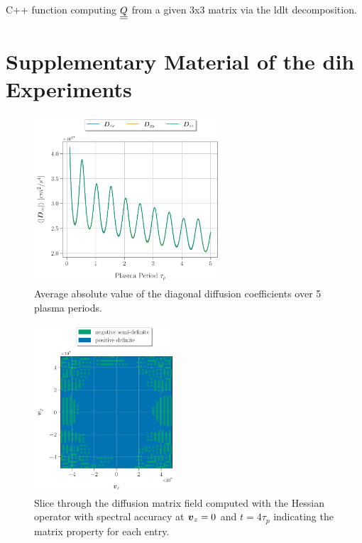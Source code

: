 \begin{listing}[!ht]
    \vspace{3.3mm}
    \inputminted[]{c++}{code_snippets/LDLT.cpp}
    \caption{C++ function computing $\matr Q$ from a given 3x3 matrix via the \gls{ldlt} decomposition.}
\label{listing:LDLTcode}
\end{listing}

\clearpage
\chapter{Supplementary Material of the \gls{dih} Experiments}
\label{appendix:suppDIH}

\begin{figure}[!ht]
    \begin{center}
        \includegraphics[width=0.62\textwidth]{figures/appendix/DIH_experiments/D_avg_diag.pdf}
    \end{center}
    \caption{Average absolute value of the diagonal diffusion coefficients over 5 plasma periods.}
    \label{fig:Ddiag_avg}
\end{figure}

\begin{figure}[!ht]
    \begin{center}
        \includegraphics[width=0.47\textwidth]{figures/appendix/DIH_experiments/D_cholesky_it0800_spectralHess.pdf}
    \end{center}
    \caption{Slice through the diffusion matrix field computed with the Hessian operator with
        spectral accuracy at $\boldsymbol{v}_z = 0$ and $t = 4 \tau_p$ indicating the 
        matrix property for each entry.}
    \label{fig:D_cholesky_spectralHess}
\end{figure}

